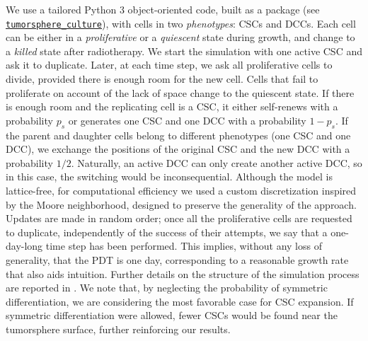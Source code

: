 \documentclass[10pt,letterpaper]{article}
\begin{document}
We use a tailored Python 3 object-oriented code, built as a package (see \href{https://github.com/JeroFotinos/tumorsphere_culture}{\lstinline|tumorsphere_culture|}), with cells in two \emph{phenotypes}: CSCs and DCCs. Each cell can be either in a \emph{proliferative} or a \emph{quiescent} state during growth, and change to a \emph{killed} state after radiotherapy. We start the simulation with one active CSC and ask it to duplicate. Later, at each time step, we ask all proliferative cells to divide, provided there is enough room for the new cell. Cells that fail to proliferate on account of the lack of space change to the quiescent state. If there is enough room and the replicating cell is a CSC, it either self-renews with a probability $p_s$ or generates one CSC and one DCC with a probability $1-p_s$. If the parent and daughter cells belong to different phenotypes (one CSC and one DCC), we exchange the positions of the original CSC and the new DCC with a probability $1/2$. Naturally, an active DCC can only create another active DCC, so in this case, the switching would be inconsequential. Although the model is lattice-free, for computational efficiency we used a custom discretization inspired by the Moore neighborhood, designed to preserve the generality of the approach. Updates are made in random order; once all the proliferative cells are requested to duplicate, independently of the success of their attempts, we say that a one-day-long time step has been performed. This implies, without any loss of generality, that the PDT is one day, corresponding to a reasonable growth rate that also aids intuition. Further details on the structure of the simulation process are reported in \cite{barberisRadialPercolationReveals2021}. We note that, by neglecting the probability of symmetric differentiation, we are considering the most favorable case for CSC expansion. If symmetric differentiation were allowed, fewer CSCs would be found near the tumorsphere surface, further reinforcing our results.
\end{document}
